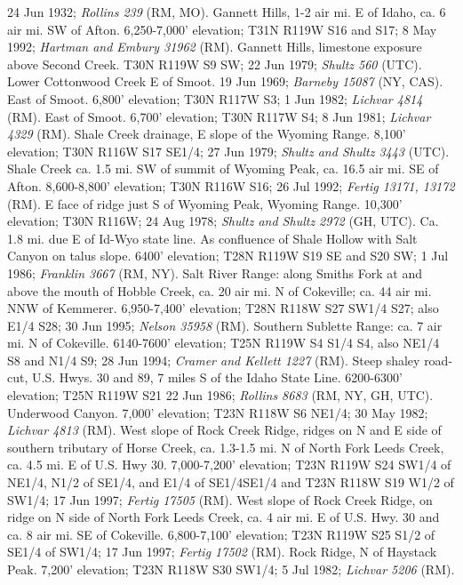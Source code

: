 24 Jun 1932; \textit{Rollins 239} (RM, MO).
Gannett Hills, 1-2 air mi. E of Idaho, ca. 6 air mi. SW of Afton.
6,250-7,000' elevation; T31N R119W S16 and S17; 8 May 1992;
\textit{Hartman and Embury 31962} (RM).
Gannett Hills, limestone exposure above Second Creek. T30N R119W S9 SW;
22 Jun 1979; \textit{Shultz 560} (UTC).
Lower Cottonwood Creek E of Smoot. 19 Jun 1969;
\textit{Barneby 15087} (NY, CAS).
East of Smoot. 6,800' elevation; T30N R117W S3; 1 Jun 1982;
\textit{Lichvar 4814} (RM).
East of Smoot. 6,700' elevation; T30N R117W S4; 8 Jun 1981;
\textit{Lichvar 4329} (RM).
Shale Creek drainage, E slope of the Wyoming Range. 8,100' elevation;
T30N R116W S17 SE1/4; 27 Jun 1979; \textit{Shultz and Shultz 3443} (UTC).
Shale Creek ca. 1.5 mi. SW of summit of Wyoming Peak, ca. 16.5 air mi. SE of
Afton. 8,600-8,800' elevation; T30N R116W S16; 26 Jul 1992;
\textit{Fertig 13171, 13172} (RM).
E face of ridge just S of Wyoming Peak, Wyoming Range. 10,300' elevation;
T30N R116W; 24 Aug 1978; \textit{Shultz and Shultz 2972} (GH, UTC).
Ca. 1.8 mi. due E of Id-Wyo state line. As confluence of Shale Hollow with
Salt Canyon on talus slope. 6400' elevation; T28N R119W S19 SE and S20 SW;
1 Jul 1986; \textit{Franklin 3667} (RM, NY).
Salt River Range: along Smiths Fork at and above the mouth of Hobble Creek,
ca. 20 air mi. N of Cokeville; ca. 44 air mi. NNW of Kemmerer.
6,950-7,400' elevation; T28N R118W S27 SW1/4 S27; also E1/4 S28; 30 Jun 1995;
\textit{Nelson 35958} (RM).
Southern Sublette Range: ca. 7 air mi. N of Cokeville. 6140-7600' elevation;
T25N R119W S4 S1/4 S4, also NE1/4 S8 and N1/4 S9; 28 Jun 1994;
\textit{Cramer and Kellett 1227} (RM).
Steep shaley road-cut, U.S. Hwys. 30 and 89, 7 miles S of the Idaho State Line.
6200-6300' elevation; T25N R119W S21 22 Jun 1986;
\textit{Rollins 8683} (RM, NY, GH, UTC).
Underwood Canyon. 7,000' elevation; T23N R118W S6 NE1/4; 30 May 1982;
\textit{Lichvar 4813} (RM).
West slope of Rock Creek Ridge, ridges on N and E side of southern tributary of
Horse Creek, ca. 1.3-1.5 mi. N of North Fork Leeds Creek, ca. 4.5 mi. E of U.S.
Hwy 30. 7,000-7,200' elevation; T23N R119W S24 SW1/4 of NE1/4, N1/2 of SE1/4,
and E1/4 of SE1/4SE1/4 and T23N R118W S19 W1/2 of SW1/4; 17 Jun 1997;
\textit{Fertig 17505} (RM).
West slope of Rock Creek Ridge, on ridge on N side of North Fork Leeds Creek,
ca. 4 air mi. E of U.S. Hwy. 30 and ca. 8 air mi. SE of Cokeville.
6,800-7,100' elevation; T23N R119W S25 S1/2 of SE1/4 of SW1/4; 17 Jun 1997;
\textit{Fertig 17502} (RM).
Rock Ridge, N of Haystack Peak. 7,200' elevation; T23N R118W S30 SW1/4;
5 Jul 1982; \textit{Lichvar 5206} (RM).
